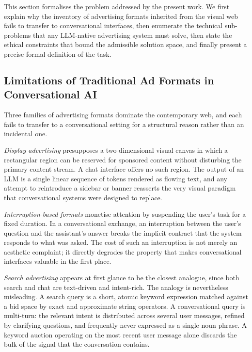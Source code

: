 This section formalises the problem addressed by the present work. We first
explain why the inventory of advertising formats inherited from the visual web
fails to transfer to conversational interfaces, then enumerate the technical
sub-problems that any LLM-native advertising system must solve, then state the
ethical constraints that bound the admissible solution space, and finally
present a precise formal definition of the task.

\subsection{Limitations of Traditional Ad Formats in Conversational AI}
\label{subsec:traditional-ad-limitations}

Three families of advertising formats dominate the contemporary web, and each
fails to transfer to a conversational setting for a structural reason rather
than an incidental one.

\emph{Display advertising} presupposes
a two-dimensional visual canvas in which a rectangular region can be reserved
for sponsored content without disturbing the primary content stream. A chat
interface offers no such region. The output of an LLM is a single linear
sequence of tokens rendered as flowing text, and any attempt to reintroduce a
sidebar or banner reasserts the very visual paradigm that conversational
systems were designed to replace.

\emph{Interruption-based formats} monetise attention by suspending the user's task for a fixed
duration. In a conversational exchange, an interruption between the user's
question and the assistant's answer breaks the implicit contract that the
system responds to what was asked. The cost of such an interruption is not
merely an aesthetic complaint; it directly degrades the property that makes conversational interfaces valuable in the first place.

\emph{Search advertising} appears at first glance to be the closest analogue,
since both search and chat are text-driven and intent-rich. The analogy is
nevertheless misleading. A search query is a short, atomic keyword expression
matched against a bid space by exact and approximate string operators. A
conversational query is multi-turn: the relevant intent is distributed across
several user messages, refined by clarifying questions, and frequently never
expressed as a single noun phrase. A keyword auction operating on the most
recent user message alone discards the bulk of the signal that the conversation
contains.

